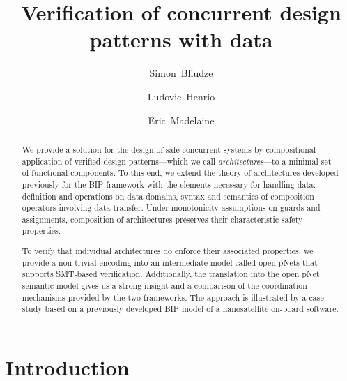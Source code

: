 \documentclass{llncs}
\newcommand{\mdash}[1][]{---#1}
\begin{document}
\graphicspath{{figures/}}

\title{Verification of concurrent design patterns with data}

\author{%
Simon~Bliudze
\and
Ludovic~Henrio
\and
Eric~Madelaine
}



\maketitle

\begin{abstract}
We provide a solution for the design of safe concurrent systems by
compositional application of verified design patterns\mdash which we
call \emph{architectures}\mdash to a minimal set of functional
components.  To this end, we extend the theory of architectures
developed previously for the BIP framework with the elements necessary
for handling data: definition and operations on data domains, syntax
and semantics of composition operators involving data transfer.  Under
monotonicity assumptions on guards and assignments, composition of
architectures preserves their characteristic safety properties.

To verify that individual architectures do enforce their associated
properties, we provide a non-trivial encoding into an intermediate
model called open pNets that supports SMT-based verification.
Additionally, the translation into the open pNet semantic model gives
us a strong insight and a comparison of the coordination mechanisms
provided by the two frameworks.  The approach is illustrated by a case
study based on a previously developed BIP model of a nanosatellite
on-board software.

\end{abstract}


\section{Introduction}
\label{secn:introduction}
\end{document}
